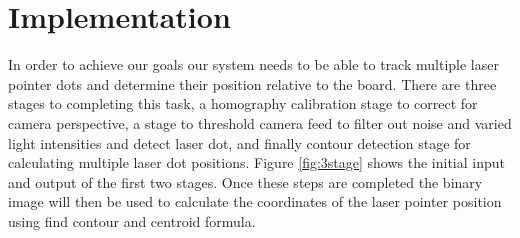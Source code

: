 \documentclass[a4paper]{article}
\begin{document}
\section{Implementation}
In order to achieve our goals our system needs to be able to track multiple laser pointer dots and determine their position relative to the board. There are three stages to completing this task, a homography calibration stage to correct for camera perspective, a stage to threshold camera feed to filter out noise and varied light intensities and detect laser dot, and finally contour detection stage for calculating multiple laser dot positions. Figure \ref{fig:3stage} shows the initial input and output of the first two stages. Once these steps are completed the binary image will then be used to calculate the coordinates of the laser pointer position using find contour and centroid formula. 
\end{document}
